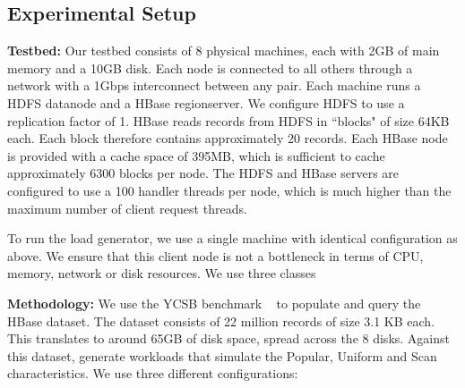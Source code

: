 \documentclass[twocolumn]{article}
\begin{document}
\subsection{Experimental Setup}
\textbf{Testbed: }Our testbed consists of 8 physical machines, each with 2GB of main memory and a 10GB disk. Each node is connected to all others through a network with a 1Gbps interconnect between any pair. Each machine runs a HDFS datanode and a HBase regionserver.
We configure HDFS to use a replication factor of 1. HBase reads records from HDFS in ``blocks" of size 64KB each. Each block therefore contains approximately 20 records. Each HBase node is provided with a cache space of 395MB, which is sufficient to cache approximately 6300 blocks per node. The HDFS and HBase servers are configured to use a 100 handler threads per node, which is much higher than the maximum number of client request threads.

To run the load generator, we use a single machine with identical configuration as above. We ensure that this client node is not a bottleneck in terms of CPU, memory, network or disk resources. We use three classes

\textbf{Methodology:}  We use the YCSB benchmark ~\cite{Cooper:2010:BCS:1807128.1807152} to populate and query the HBase dataset. The dataset consists of 22 million records of size 3.1 KB each. This translates to around 65GB of disk space, spread across the 8 disks. Against this dataset, generate workloads that simulate the Popular, Uniform and Scan characteristics. We use three different configurations:
\end{document}
